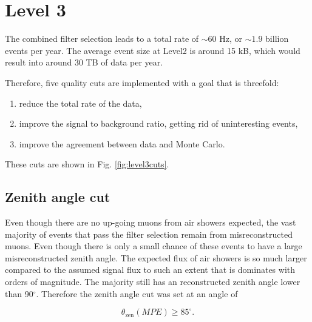 \section{Level 3}
The combined filter selection leads to a total rate of $\sim60$ Hz, or $\sim1.9$ billion events per year. The average event size at Level2 is around 15 kB, which would result into around 30 TB of data per year.

Therefore, five quality cuts are implemented with a goal that is threefold:
\vspace{2mm}
\begin{enumerate}
\item reduce the total rate of the data,
\item improve the signal to background ratio, getting rid of uninteresting events,
\item improve the agreement between data and Monte Carlo.
\end{enumerate}
\vspace{2mm}
\noindent These cuts are shown in Fig. \ref{fig:level3cuts}.

\subsection{Zenith angle cut}
Even though there are no up-going muons from air showers expected, the vast majority of events that pass the filter selection remain from misreconstructed muons. Even though there is only a small chance of these events to have a large misreconstructed zenith angle. The expected flux of air showers is so much larger compared to the assumed signal flux to such an extent that is dominates with orders of magnitude. The majority still has an reconstructed zenith angle lower than 90$^\circ$. Therefore the zenith angle cut was set at an angle of 

\begin{equation}
\theta_\textrm{zen} (MPE) \geq 85^\circ.
\end{equation}

